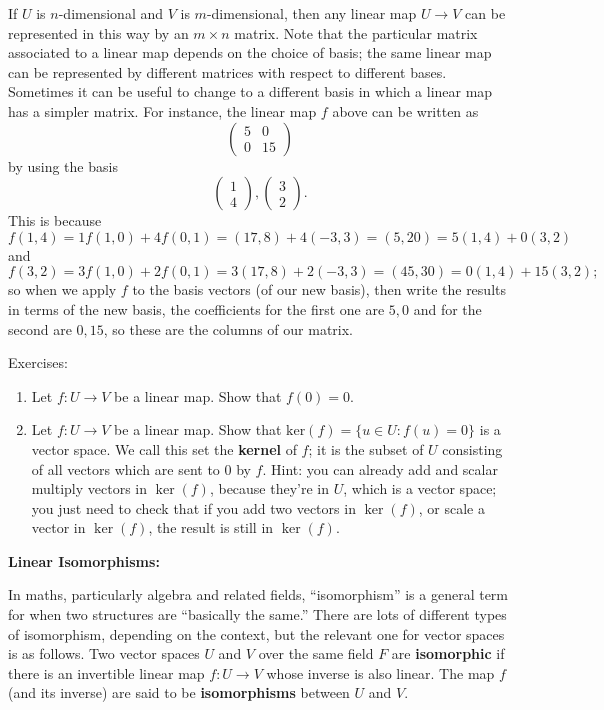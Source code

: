 \documentclass{article}
\begin{document}
If $U$ is $n$-dimensional and $V$ is $m$-dimensional, then any linear map $U\to V$ can be represented in this way by an $m\times n$ matrix. Note that the particular matrix associated to a linear map depends on the choice of basis; the same linear map can be represented by different matrices with respect to different bases. Sometimes it can be useful to change to a different basis in which a linear map has a simpler matrix. For instance, the linear map $f$ above can be written as 
\[\left(\begin{array}{cc} 5 & 0\\ 0 & 15\end{array}\right)\]
by using the basis
\[\left(\begin{array}{c} 1\\4\end{array}\right),\left(\begin{array}{c}3\\2\end{array}\right).\]
This is because
\[f(1,4)=1f(1,0)+4f(0,1)=(17,8)+4(-3,3)=(5,20)=5(1,4)+0(3,2)\]
and
\[f(3,2)=3f(1,0)+2f(0,1)=3(17,8)+2(-3,3)=(45,30)=0(1,4)+15(3,2);\]
so when we apply $f$ to the basis vectors (of our new basis), then write the results in terms of the new basis, the coefficients for the first one are $5,0$ and for the second are $0,15$, so these are the columns of our matrix.\bigskip

Exercises:

\begin{enumerate}
	\item Let $f:U\to V$ be a linear map. Show that $f(0)=0$.
	\item Let $f:U\to V$ be a linear map. Show that $\mathrm{ker}(f)=\{u\in U:f(u)=0\}$ is a vector space. We call this set the \textbf{kernel} of $f$; it is the subset of $U$ consisting of all vectors which are sent to 0 by $f$. Hint: you can already add and scalar multiply vectors in $\ker(f)$, because they're in $U$, which is a vector space; you just need to check that if you add two vectors in $\ker(f)$, or scale a vector in $\ker(f)$, the result is still in $\ker(f)$.
\end{enumerate}



\textbf{Linear Isomorphisms:}\bigskip


In maths, particularly algebra and related fields, ``isomorphism'' is a general term for when two structures are ``basically the same.'' There are lots of different types of isomorphism, depending on the context, but the relevant one for vector spaces is as follows. Two vector spaces $U$ and $V$ over the same field $F$ are \textbf{isomorphic} if there is an invertible linear map $f:U\to V$ whose inverse is also linear. The map $f$ (and its inverse) are said to be \textbf{isomorphisms} between $U$ and $V$.
\end{document}
